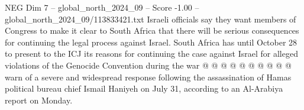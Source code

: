 \begin{textsample}{NEG Dim 7 – global\_north\_2024\_09 – Score -1.00 – global\_north\_2024\_09/113833421.txt}
Israeli officials say they want members of Congress to make it clear to South Africa that there will be serious consequences for continuing the legal process against Israel.
South Africa has until October 28 to present to the ICJ its reasons for continuing the case against Israel for alleged violations of the Genocide Convention during the war @ @ @ @ @ @ @ @ @ @ warn of a severe and widespread response following the assassination of Hamas political bureau chief Ismail Haniyeh on July 31, according to an Al-Arabiya report on Monday.

\end{textsample}
